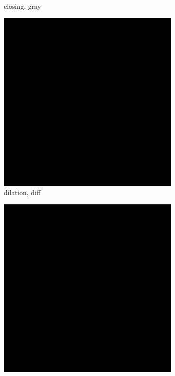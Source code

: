 \begin{figure}[!ht]
\begin{subfigure}[t]{0.22\textwidth}
    \caption{closing, gray}
    \centering
  \end{subfigure}
\begin{subfigure}[t]{0.22\textwidth}
    \includegraphics[width=0.9\linewidth]{../project/images/outputs/compare_gray/dilation_diff.png}
    \caption{dilation, diff}
    \centering
  \end{subfigure}
\begin{subfigure}[t]{0.22\textwidth}
    \includegraphics[width=0.9\linewidth]{../project/images/outputs/compare_gray/erosion_diff.png}

\end{subfigure}
\end{figure}
